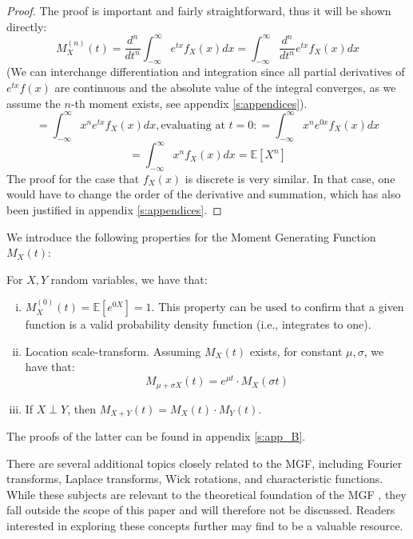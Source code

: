 \begin{proof}
    The proof is important and fairly straightforward, thus it will be shown directly:
    \[M_X^{(n)}(t) = \frac{d^n}{dt^n} \int_{-\infty}^{\infty} e^{tx} f_X(x) dx = \int_{-\infty}^{\infty} \frac{d^n}{dt^n} e^{tx} f_X(x) dx\] (We can interchange differentiation and integration since all partial derivatives of \(e^{tx} f(x)\) are continuous and the absolute value of the integral converges, as we assume the \(n\)-th moment exists, see appendix \ref{s:appendices}).
    \[ = \int_{-\infty}^{\infty} x^n e^{tx} f_X(x) dx, \text{evaluating at } t = 0: = \int_{-\infty}^{\infty} x^n e^{0x} f_X(x) dx\]
    \[ = \int_{-\infty}^{\infty} x^n f_X(x) dx = \mathbb{E}[X^n]\]
    The proof for the case that \(f_X(x)\) is discrete is very similar. In that case, one would have to change the order of the derivative and summation, which has also been justified in appendix \ref{s:appendices}.
\end{proof}


We introduce the following properties for the Moment Generating Function \(M_X(t)\):
\begin{proposition}\label{p: moments}
    For \(X, Y\) random variables, we have that:
    \begin{enumerate}[(i)]
        \item \(M_X^{(0)}(t) = \mathbb{E}[e^{0X}] = 1\). This property can be used to confirm that a given function is a valid probability density function (i.e., integrates to one).
        \item Location scale-transform. Assuming \(M_X(t)\) exists, for constant \(\mu, \sigma\), we have that: 
        \[M_{\mu + \sigma X}(t) = e^{\mu t} \cdot M_X(\sigma t)\]
        \item If \(X \perp Y\), then \(M_{X+Y}(t) = M_X(t)\cdot M_Y(t)\).
    \end{enumerate}
\end{proposition}

The proofs of the latter can be found in appendix \ref{s:app_B}.

There are several additional topics closely related to the MGF, including Fourier transforms, Laplace transforms, Wick rotations, and characteristic functions. While these subjects are relevant to the theoretical foundation of the MGF , they fall outside the scope of this paper and will therefore not be discussed. Readers interested in exploring these concepts further may find \cite{kolmogorov1999} to be a valuable resource.

